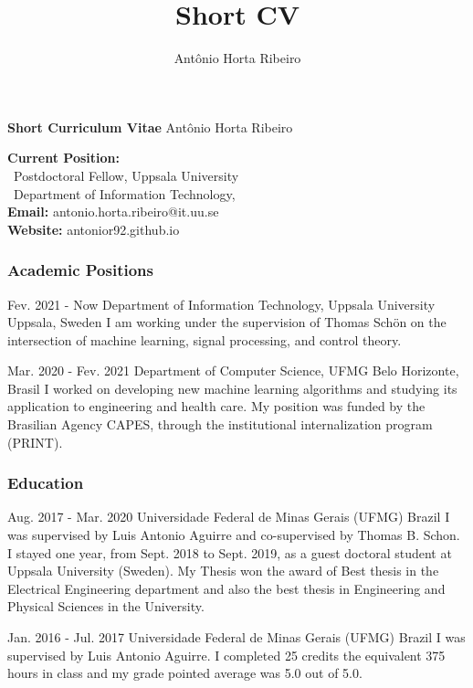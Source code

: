 \documentclass[10pt,letterpaper]{article} %
\title{Short CV}
\author{Ant\^onio Horta Ribeiro}
\begin{document}
{\Large \textbf{Short Curriculum Vitae} \hfill {\sc  Ant\^onio Horta Ribeiro}}

    \vspace{10pt}
\begin{multicols}{2}
    \small
    \textbf{Current Position:}\\
    \, Postdoctoral Fellow, Uppsala University \\
    \, Department of Information Technology,\\
    {\bf Email:} antonio.horta.ribeiro@it.uu.se\\
    {\bf Website:} antonior92.github.io
\end{multicols}

\subsubsection*{Academic Positions} %


    { Fev. 2021 -   Now }
    { Department of Information Technology, Uppsala University }
    { Uppsala, Sweden }
    { I am working under the supervision of Thomas Schön on the intersection of machine learning, signal processing, and control theory. }

    { Mar. 2020 -   Fev. 2021 }
    { Department of Computer Science, UFMG }
    { Belo Horizonte, Brasil }
    { I worked on developing new machine learning algorithms and studying its application to engineering and health care. My position was funded by the Brasilian Agency CAPES, through the institutional internalization program (PRINT). }



\subsubsection*{Education} %

    { Aug. 2017 - Mar. 2020 }
    { Universidade Federal de Minas Gerais (UFMG) }
    { Brazil }
    { I was supervised by Luis Antonio Aguirre and co-supervised by Thomas B. Schon.  I stayed one year, from Sept. 2018 to Sept. 2019, as a guest doctoral student at Uppsala University (Sweden). My Thesis won the award of Best thesis in the Electrical Engineering department and also the best thesis in Engineering and Physical Sciences in the University. }

    { Jan. 2016 - Jul. 2017 }
    { Universidade Federal de Minas Gerais (UFMG) }
    { Brazil }
    { I was supervised by Luis Antonio Aguirre. I completed 25 credits the equivalent 375 hours in class and my grade pointed average was 5.0 out of 5.0. }
\end{document}
